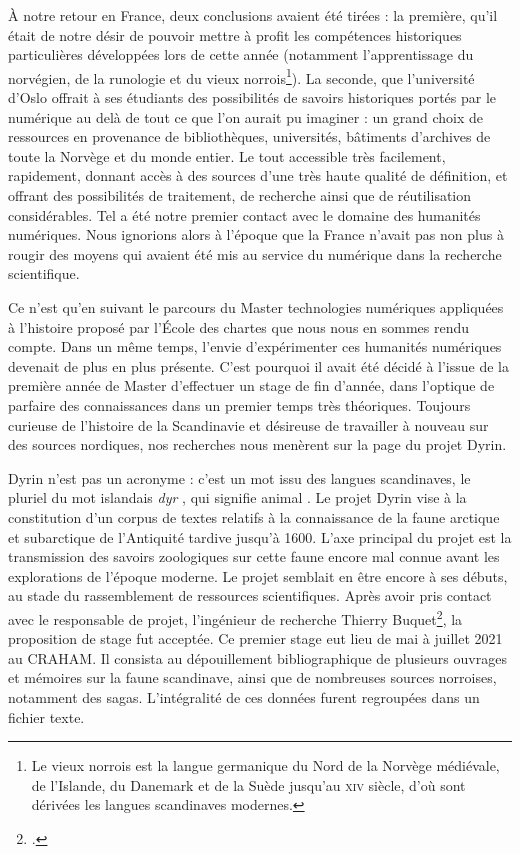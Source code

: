 \documentclass[a4paper,12pt,twoside]{book}
\begin{document}
À notre retour en France, deux conclusions avaient été tirées : la première, qu'il était de notre désir de pouvoir mettre à profit les compétences historiques particulières développées lors de cette année (notamment l'apprentissage du norvégien, de la runologie et du vieux norrois\footnote{Le vieux norrois est la langue germanique du Nord de la Norvège médiévale, de l'Islande, du Danemark et de la Suède jusqu'au \textsc{xiv}\ieme{} siècle, d'où sont dérivées les langues scandinaves modernes.}). La seconde, que l'université d'Oslo offrait à ses étudiants des possibilités de savoirs historiques portés par le numérique au delà de tout ce que l'on aurait pu imaginer : un grand choix de ressources en provenance de bibliothèques, universités, bâtiments d'archives de toute la Norvège et du monde entier. Le tout accessible très facilement, rapidement, donnant accès à des sources d'une très haute qualité de définition, et offrant des possibilités de traitement, de recherche ainsi que de réutilisation considérables. Tel a été notre premier contact avec le domaine des humanités numériques. Nous ignorions alors à l'époque que la France n'avait pas non plus à rougir des moyens qui avaient été mis au service du numérique dans la recherche scientifique.

Ce n'est qu'en suivant le parcours du Master technologies numériques appliquées à l'histoire proposé par l'École des chartes que nous nous en sommes rendu compte. Dans un même temps, l'envie d'expérimenter ces humanités numériques devenait de plus en plus présente. C'est pourquoi il avait été décidé à l'issue de la première année de Master d'effectuer un stage de fin d'année, dans l'optique de parfaire des connaissances dans un premier temps très théoriques. Toujours curieuse de l'histoire de la Scandinavie et désireuse de travailler à nouveau sur des sources nordiques, nos recherches nous menèrent sur la page du projet Dyrin.

Dyrin n'est pas un acronyme : c'est un mot issu des langues scandinaves, le pluriel du mot islandais \og \textit{dyr} \fg, qui signifie \og animal \fg. Le projet Dyrin vise à la constitution d'un corpus de textes relatifs à la connaissance de la faune arctique et subarctique de l'Antiquité tardive jusqu'à 1600. L'axe principal du projet est la transmission des savoirs zoologiques sur cette faune encore mal connue avant les explorations de l'époque moderne. Le projet semblait en être encore à ses débuts, au stade du rassemblement de ressources scientifiques.
Après avoir pris contact avec le responsable de projet, l'ingénieur de recherche Thierry Buquet\footcite{buquet_thierry_nodate}, la proposition de stage fut acceptée. Ce premier stage eut lieu de mai à juillet 2021 au \acrfull{CRAHAM}. Il consista au dépouillement bibliographique de plusieurs ouvrages et mémoires sur la faune scandinave, ainsi que de nombreuses sources norroises, notamment des sagas. L'intégralité de ces données furent regroupées dans un fichier texte.
\end{document}
